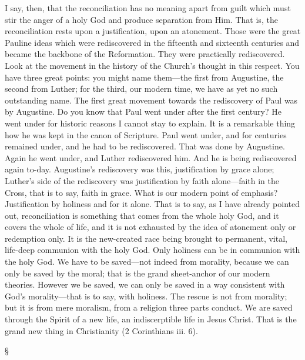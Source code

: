 \documentclass[12pt,letterpaper,oneside]{book}
\begin{document}
I say, then, that the reconciliation has no 
meaning apart from guilt which must stir the 
anger of a holy God and produce separation 
from Him. That is, the reconciliation rests 
upon a justification, upon an atonement. Those 
were the great Pauline ideas which were 
rediscovered in the fifteenth and sixteenth 
centuries and became the backbone of the Reformation.
They were practically rediscovered. 
Look at the movement in the history of the 
Church's thought in this respect. You have 
three great points: you might name them---the 
first from Augustine, the second from Luther; 
for the third, our modern time, we have as 
yet no such outstanding name. The first great 
movement towards the rediscovery of Paul 
was by Augustine. Do you know that Paul 
went under after the first century? He went 
under for historic reasons I cannot stay to 
explain. It is a remarkable thing how he was 
kept in the canon of Scripture. Paul went 
under, and for centuries remained under, and 
he had to be rediscovered. That was done by 
Augustine. Again he went under, and Luther 
rediscovered him. And he is being rediscovered 
again to-day. Augustine's rediscovery was this, 
justification by grace alone; Luther's side of the 
rediscovery was justification by faith alone---faith 
in the Cross, that is to say, faith in grace. 
What is our modern point of emphasis? Justification 
by holiness and for it alone. That is to 
say, as I have already pointed out, reconciliation 
is something that comes from the whole holy 
God, and it covers the whole of life, and it is not 
exhausted by the idea of atonement only or 
redemption only. It is the new-created race 
being brought to permanent, vital, life-deep 
communion with the holy God. Only holiness 
can be in communion with the holy God. We 
have to be saved---not indeed from morality, 
because we can only be saved by the moral; that 
is the grand sheet-anchor of our modern theories. 
However we be saved, we can only be saved 
in a way consistent with God's morality---that 
is to say, with holiness. The rescue is not from 
morality; but it is from mere moralism, from 
a religion three parts conduct. We are saved 
through the Spirit of a new life, an indiscerptible 
life in Jesus Christ. That is the grand 
new thing in Christianity (2 Corinthians iii. 6). 

\begin{center}
\S
\end{center}
\end{document}
